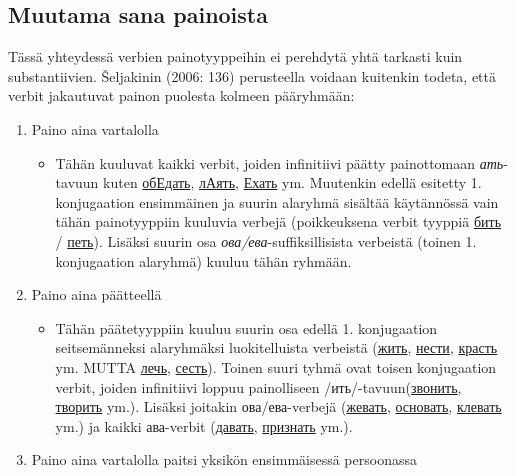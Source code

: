 \documentclass[]{scrartcl}
\providecommand{\tightlist}{%
  \setlength{\itemsep}{0pt}\setlength{\parskip}{0pt}}
\begin{document}
\subsection{Muutama sana painoista}\label{muutama-sana-painoista}

Tässä yhteydessä verbien painotyyppeihin ei perehdytä yhtä tarkasti kuin
substantiivien. Šeljakinin (2006: 136) perusteella voidaan kuitenkin
todeta, että verbit jakautuvat painon puolesta kolmeen pääryhmään:

\begin{enumerate}
\def\labelenumi{\arabic{enumi}.}
\tightlist
\item
  Paino aina vartalolla

  \begin{itemize}
  \tightlist
  \item
    Tähän kuuluvat kaikki verbit, joiden infinitiivi päätty painottomaan
    \emph{ать}-tavuun kuten
    \href{http://ru.wiktionary.org/wiki/обЕдать}{обЕдать},
    \href{http://ru.wiktionary.org/wiki/лАять}{лАять},
    \href{http://ru.wiktionary.org/wiki/Ехать}{Ехать} ym. Muutenkin
    edellä esitetty 1. konjugaation ensimmäinen ja suurin alaryhmä
    sisältää käytännössä vain tähän painotyyppiin kuuluvia verbejä
    (poikkeuksena verbit tyyppiä
    \href{http://ru.wiktionary.org/wiki/бить}{бить} /
    \href{http://ru.wiktionary.org/wiki/петь}{петь}). Lisäksi suurin osa
    \emph{ова/ева}-suffiksillisista verbeistä (toinen 1. konjugaation
    alaryhmä) kuuluu tähän ryhmään.
  \end{itemize}
\item
  Paino aina päätteellä

  \begin{itemize}
  \tightlist
  \item
    Tähän päätetyyppiin kuuluu suurin osa edellä 1. konjugaation
    seitsemänneksi alaryhmäksi luokitelluista verbeistä
    (\href{http://ru.wiktionary.org/wiki/жить}{жить},
    \href{http://ru.wiktionary.org/wiki/нести}{нести},
    \href{http://ru.wiktionary.org/wiki/красть}{красть} ym. MUTTA
    \href{http://ru.wiktionary.org/wiki/лечь}{лечь},
    \href{http://ru.wiktionary.org/wiki/сесть}{сесть}). Toinen suuri
    tyhmä ovat toisen konjugaation verbit, joiden infinitiivi loppuu
    painolliseen
    /ить/-tavuun(\href{http://ru.wiktionary.org/wiki/звонить}{звонить},
    \href{http://ru.wiktionary.org/wiki/творить}{творить} ym.). Lisäksi
    joitakin ова/ева-verbejä
    (\href{http://ru.wiktionary.org/wiki/жевать}{жевать},
    \href{http://ru.wiktionary.org/wiki/основать}{основать},
    \href{http://ru.wiktionary.org/wiki/клевать}{клевать} ym.) ja kaikki
    ава-verbit (\href{http://ru.wiktionary.org/wiki/давать}{давать},
    \href{http://ru.wiktionary.org/wiki/признать}{признать} ym.).
  \end{itemize}
\item
  Paino aina vartalolla paitsi yksikön ensimmäisessä persoonassa


\end{enumerate}
\end{document}
